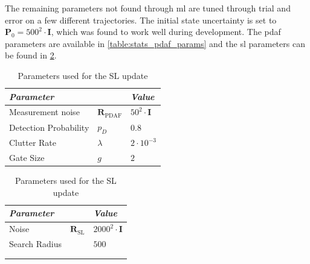 The remaining parameters not found through \acrshort{ml} are tuned through trial and error on a few different trajectories.
The initial state uncertainty is set to $\boldsymbol{P}_0 = 500^2 \cdot \boldsymbol{I}$, which was found to work well during development. The \acrshort{pdaf} parameters are available in \cref{table:stats_pdaf_params} and the \acrshort{sl} parameters can be found in \cref{table:stats_sl_params}.

\begin{table}[h]
    \centering
    \begin{subtable}{0.49\textwidth}
        \begin{tabular}{|lll|}
            \textit{\textbf{Parameter}} &                                & \textit{\textbf{Value}}     \\ \hline
            Measurement noise           & $\boldsymbol{R}_{\text{PDAF}}$ & $50^2 \cdot \boldsymbol{I}$ \\
            Detection Probability       & $p_D$                          & $0.8$                       \\
            Clutter Rate                & $\lambda$                      & $2 \cdot 10^{-3}$           \\
            Gate Size                   & $g$                            & $2$
        \end{tabular}
        \caption{Parameters used for \acrshort{pdaf} update}
        \label{table:stats_pdaf_params}
    \end{subtable}
    \begin{subtable}{0.49 \textwidth}

        \centering
        \begin{tabular}{|lll|}
            \textit{\textbf{Parameter}} &                              & \textit{\textbf{Value}}       \\ \hline
            Noise                       & $\boldsymbol{R}_{\text{SL}}$ & $2000^2 \cdot \boldsymbol{I}$ \\
            Search Radius               &                              & $500$                         \\
                                        &                              &                               \\
                                        &                              &
        \end{tabular}
        \caption{Parameters used for the SL update}
        \label{table:stats_sl_params}
    \end{subtable}
\end{table}



